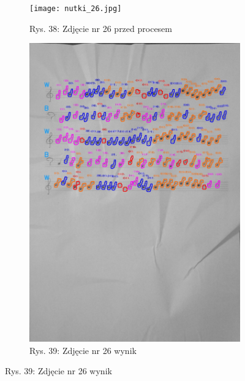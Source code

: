 \documentclass[11pt]{article}
\begin{document}
\begin{figure}[H]
    \centering
    \captionsetup[subfigure]{labelformat=empty}
    \begin{subfigure}[b]{0.475\textwidth}
        \centering
        \graphicspath{ {Resources/} }
        \texttt{[image: nutki\_26.jpg]}
        \caption[]%
        {{\small Rys. 38: Zdjęcie nr 26 przed procesem}}
        \label{fig:sub1}
    \end{subfigure}
    \hfill
    \begin{subfigure}[b]{0.475\textwidth}
        \centering
        \graphicspath{ {blobs/} }
        \includegraphics[width=\textwidth]{26_cnts.jpg}
        \caption[]%
        {{\small Rys. 39: Zdjęcie nr 26 wynik}}
        \label{fig:sub2}
    \end{subfigure}
\end{figure}
\end{document}
